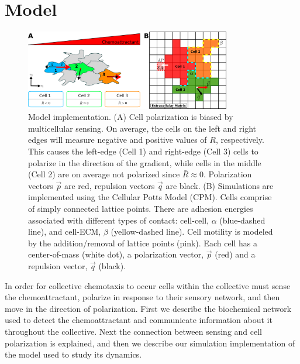 \section{Model}

\begin{figure}
    \centering
        \includegraphics[width=0.80\textwidth]{../fig/ch4_fig1.png}
    \caption{Model implementation. (A) Cell polarization is biased by multicellular sensing. On average, the cells on the left and right edges will measure negative and positive values of $R$, respectively. This causes the left-edge (Cell 1) and right-edge (Cell 3) cells to polarize in the direction of the gradient, while cells in the middle (Cell 2) are on average not polarized since $\bar{R} \approx 0$. Polarization vectors $\vec{p}$ are red, repulsion vectors $\vec{q}$ are black. (B) Simulations are implemented using the Cellular Potts Model (CPM). Cells comprise of simply connected lattice points. There are adhesion energies associated with different types of contact: cell-cell, $\alpha$ (blue-dashed line), and cell-ECM, $\beta$ (yellow-dashed line). Cell motility is modeled by the addition/removal of lattice points (pink). Each cell has a center-of-mass (white dot), a polarization vector, $\vec{p}$ (red) and a repulsion vector, $\vec{q}$ (black).} \label{fig:model}
\end{figure}

In order for collective chemotaxis to occur cells within the collective must sense the chemoattractant, polarize in response to their sensory network, and then move in the direction of polarization. First we describe the biochemical network used to detect the chemoattractant and communicate information about it throughout the collective. Next the connection between sensing and cell polarization is explained, and then we describe our simulation implementation of the model used to study its dynamics.


